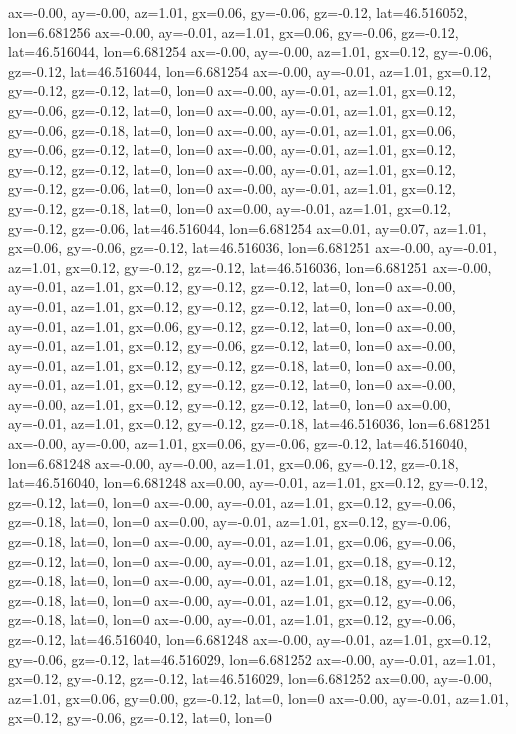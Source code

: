ax=-0.00, ay=-0.00, az=1.01, gx=0.06, gy=-0.06, gz=-0.12, lat=46.516052, lon=6.681256
ax=-0.00, ay=-0.01, az=1.01, gx=0.06, gy=-0.06, gz=-0.12, lat=46.516044, lon=6.681254
ax=-0.00, ay=-0.00, az=1.01, gx=0.12, gy=-0.06, gz=-0.12, lat=46.516044, lon=6.681254
ax=-0.00, ay=-0.01, az=1.01, gx=0.12, gy=-0.12, gz=-0.12, lat=0, lon=0
ax=-0.00, ay=-0.01, az=1.01, gx=0.12, gy=-0.06, gz=-0.12, lat=0, lon=0
ax=-0.00, ay=-0.01, az=1.01, gx=0.12, gy=-0.06, gz=-0.18, lat=0, lon=0
ax=-0.00, ay=-0.01, az=1.01, gx=0.06, gy=-0.06, gz=-0.12, lat=0, lon=0
ax=-0.00, ay=-0.01, az=1.01, gx=0.12, gy=-0.12, gz=-0.12, lat=0, lon=0
ax=-0.00, ay=-0.01, az=1.01, gx=0.12, gy=-0.12, gz=-0.06, lat=0, lon=0
ax=-0.00, ay=-0.01, az=1.01, gx=0.12, gy=-0.12, gz=-0.18, lat=0, lon=0
ax=0.00, ay=-0.01, az=1.01, gx=0.12, gy=-0.12, gz=-0.06, lat=46.516044, lon=6.681254
ax=0.01, ay=0.07, az=1.01, gx=0.06, gy=-0.06, gz=-0.12, lat=46.516036, lon=6.681251
ax=-0.00, ay=-0.01, az=1.01, gx=0.12, gy=-0.12, gz=-0.12, lat=46.516036, lon=6.681251
ax=-0.00, ay=-0.01, az=1.01, gx=0.12, gy=-0.12, gz=-0.12, lat=0, lon=0
ax=-0.00, ay=-0.01, az=1.01, gx=0.12, gy=-0.12, gz=-0.12, lat=0, lon=0
ax=-0.00, ay=-0.01, az=1.01, gx=0.06, gy=-0.12, gz=-0.12, lat=0, lon=0
ax=-0.00, ay=-0.01, az=1.01, gx=0.12, gy=-0.06, gz=-0.12, lat=0, lon=0
ax=-0.00, ay=-0.01, az=1.01, gx=0.12, gy=-0.12, gz=-0.18, lat=0, lon=0
ax=-0.00, ay=-0.01, az=1.01, gx=0.12, gy=-0.12, gz=-0.12, lat=0, lon=0
ax=-0.00, ay=-0.00, az=1.01, gx=0.12, gy=-0.12, gz=-0.12, lat=0, lon=0
ax=0.00, ay=-0.01, az=1.01, gx=0.12, gy=-0.12, gz=-0.18, lat=46.516036, lon=6.681251
ax=-0.00, ay=-0.00, az=1.01, gx=0.06, gy=-0.06, gz=-0.12, lat=46.516040, lon=6.681248
ax=-0.00, ay=-0.00, az=1.01, gx=0.06, gy=-0.12, gz=-0.18, lat=46.516040, lon=6.681248
ax=0.00, ay=-0.01, az=1.01, gx=0.12, gy=-0.12, gz=-0.12, lat=0, lon=0
ax=-0.00, ay=-0.01, az=1.01, gx=0.12, gy=-0.06, gz=-0.18, lat=0, lon=0
ax=0.00, ay=-0.01, az=1.01, gx=0.12, gy=-0.06, gz=-0.18, lat=0, lon=0
ax=-0.00, ay=-0.01, az=1.01, gx=0.06, gy=-0.06, gz=-0.12, lat=0, lon=0
ax=-0.00, ay=-0.01, az=1.01, gx=0.18, gy=-0.12, gz=-0.18, lat=0, lon=0
ax=-0.00, ay=-0.01, az=1.01, gx=0.18, gy=-0.12, gz=-0.18, lat=0, lon=0
ax=-0.00, ay=-0.01, az=1.01, gx=0.12, gy=-0.06, gz=-0.18, lat=0, lon=0
ax=-0.00, ay=-0.01, az=1.01, gx=0.12, gy=-0.06, gz=-0.12, lat=46.516040, lon=6.681248
ax=-0.00, ay=-0.01, az=1.01, gx=0.12, gy=-0.06, gz=-0.12, lat=46.516029, lon=6.681252
ax=-0.00, ay=-0.01, az=1.01, gx=0.12, gy=-0.12, gz=-0.12, lat=46.516029, lon=6.681252
ax=0.00, ay=-0.00, az=1.01, gx=0.06, gy=0.00, gz=-0.12, lat=0, lon=0
ax=-0.00, ay=-0.01, az=1.01, gx=0.12, gy=-0.06, gz=-0.12, lat=0, lon=0

